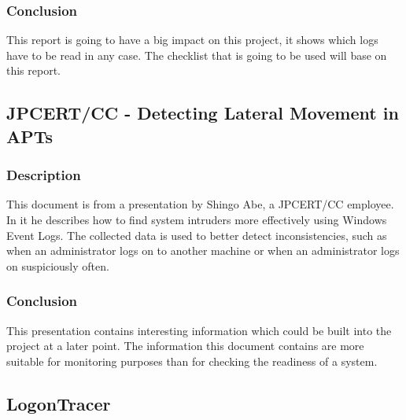 \subsubsection{Conclusion}
This report is going to have a big impact on this project, it shows which logs have to be read in any case. The checklist that is going to be used will base on this report.

\subsection{JPCERT/CC - Detecting Lateral Movement in APTs} \label{DetectingLateral}
\subsubsection{Description}
This document \cite{Abe2016} is from a presentation by Shingo Abe, a JPCERT/CC employee. In it he describes how to find system intruders more effectively using Windows Event Logs. The collected data is used to better detect inconsistencies, such as when an administrator logs on to another machine or when an administrator logs on suspiciously often. 
\subsubsection{Conclusion}
This presentation contains interesting information which could be built into the project at a later point. The information this document contains are more suitable for monitoring purposes than for checking the readiness of a system.

\subsection{LogonTracer}
